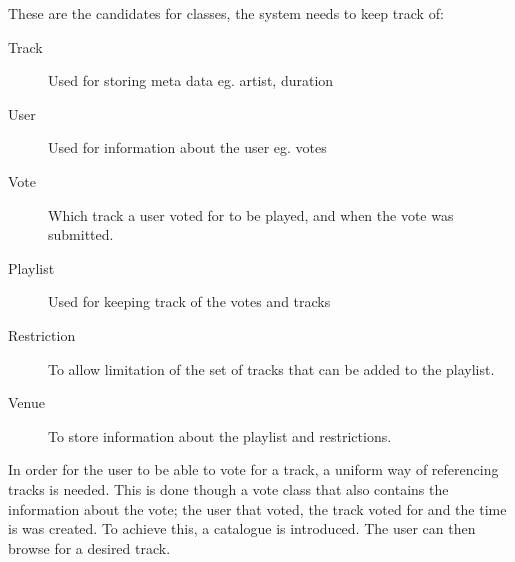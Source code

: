 These are the candidates for classes, the system needs to keep track of:
\begin{description}
    \item[Track]

    Used for storing meta data eg. artist, duration
    \item[User]

    Used for information about the user eg. votes
    \item[Vote]

    Which track a user voted for to be played, and when the vote was submitted.
    \item[Playlist]

    Used for keeping track of the votes and tracks
    \item[Restriction]

    To allow limitation of the set of tracks that can be added to the playlist.
    \item[Venue]

    To store information about the playlist and restrictions.
\end{description}

In order for the user to be able to vote for a track, a uniform way of referencing tracks is needed. This is done though a vote class that also contains the information about the vote; the user that voted, the track voted for and the time is was created. To achieve this, a catalogue is introduced. The user can then browse for a desired track.
